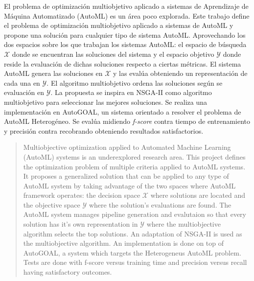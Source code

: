 \begin{resumen}
	El problema de optimizaci\'on multiobjetivo aplicado a sistemas de Aprendizaje de M\'aquina Automatizado (AutoML) es un \'area poco explorada. Este trabajo define el problema de optimizaci\'on multiobjetivo aplicado a sistemas de AutoML y propone una soluci\'on para cualquier tipo de sistema AutoML.
    Aprovechando los dos espacios sobre los que trabajan los sistemas AutoML: el espacio de b\'usqueda $\mathcal{X}$ donde se encuentran las soluciones del sistema y el espacio objetivo $\mathcal{Y}$ donde reside la evaluaci\'on de dichas soluciones respecto a ciertas m\'etricas. El sistema AutoML  genera las soluciones en $\mathcal{X}$ y las eval\'ua obteniendo un representaci\'on de cada una en $\mathcal{Y}$. El algoritmo multiobjetivo  ordena las soluciones seg\'un se evaluaci\'on en $\mathcal{Y}$.
    La propuesta se inspira en NSGA-II como algoritmo multiobjetivo para seleccionar las mejores soluciones. 
    Se realiza una implementaci\'on en AutoGOAL, un sistema orientado a resolver el problema de AutoML Heterog\'eneo.
    Se eval\'ua midiendo \textit{f-score} contra tiempo de entrenamiento y precisi\'on contra recobrando obteniendo resultados satisfactorios. 

\end{resumen}

\begin{abstract}
    Multiobjective optimization applied to Automated Machine Learning (AutoML) systems is an underexplored research area. This project defines the optimization problem of multiple criteria applied to AutoML systems. It proposes a generalized solution that can be applied to any type of AutoML system by taking advantage of the two spaces where AutoML framework operates: the decision space $\mathcal{X}$ where solutions are located and the objective space $\mathcal{Y}$ where the solution's evaluations are found. The AutoML system manages pipeline generation and evalutaion so that every solution has it's own representation in $\mathcal{Y}$ where the multiobjective algorithm selects the top solutions. An adaptation of NSGA-II is used as the multiobjective algorithm. An implementation is done on top of AutoGOAL, a system which targets the Heterogeneus AutoML problem. Tests are done with f-score versus training time and precision versus recall having satisfactory outcomes.
\end{abstract}
